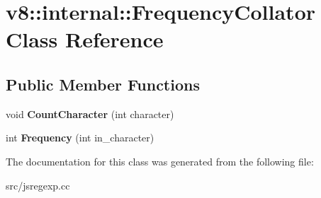 \hypertarget{classv8_1_1internal_1_1_frequency_collator}{}\section{v8\+:\+:internal\+:\+:Frequency\+Collator Class Reference}
\label{classv8_1_1internal_1_1_frequency_collator}
\subsection*{Public Member Functions}
\begin{DoxyCompactItemize}
\item 
\hypertarget{classv8_1_1internal_1_1_frequency_collator_ade011457b027caad1d56d84de9c182ff}{}void {\bfseries Count\+Character} (int character)\label{classv8_1_1internal_1_1_frequency_collator_ade011457b027caad1d56d84de9c182ff}

\item 
\hypertarget{classv8_1_1internal_1_1_frequency_collator_a30b9336ba6e9fc2a358408da97e5c107}{}int {\bfseries Frequency} (int in\+\_\+character)\label{classv8_1_1internal_1_1_frequency_collator_a30b9336ba6e9fc2a358408da97e5c107}

\end{DoxyCompactItemize}


The documentation for this class was generated from the following file\+:\begin{DoxyCompactItemize}
\item 
src/jsregexp.\+cc\end{DoxyCompactItemize}

